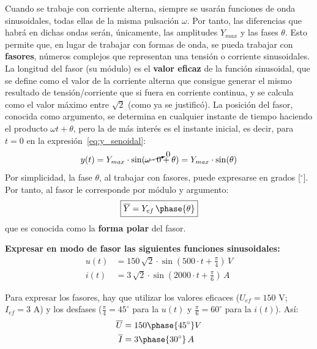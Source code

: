 Cuando se trabaje con corriente alterna, siempre se usarán funciones
de onda sinusoidales, todas ellas de la misma pulsación $\omega$. Por
tanto, las diferencias que habrá en dichas ondas serán, únicamente,
las amplitudes $Y_{max}$ y las fases $\theta$. Esto permite que, en
lugar de trabajar con formas de onda, se pueda trabajar con
\textbf{fasores}, números complejos que representan una tensión o
corriente
sinusoidales. %
La longitud del fasor (su módulo) es el \textbf{valor eficaz} de la
función sinusoidal, que se define como el valor de la corriente
alterna que consigue generar el mismo resultado de tensión/corriente
que si fuera en corriente continua, y se calcula como el valor máximo
entre $\sqrt{2}$ (como ya se justificó).
La posición del fasor, conocida como argumento, se determina en
cualquier instante de tiempo haciendo el producto $\omega t+\theta$,
pero la de más interés es el instante inicial, es decir, para $t=0$ en
la expresión~\eqref{eq:y_senoidal}:
\begin{equation*}
  y(t)=Y_{max}\cdot\sin(\cancelto{0}{\omega \cdot 0}+\theta)=Y_{max}\cdot\sin(\theta)
\end{equation*}
Por simplicidad, la fase $\theta$, al trabajar con fasores, puede
expresarse en grados [$^\circ$]. Por tanto, al fasor le corresponde
por módulo y argumento:
\begin{equation}
  \boxed{\overline{Y}=Y_{ef}\,\phase{\theta}}
\end{equation}
que es conocida como la \textbf{forma polar} del fasor.
	
\begin{example}
  \textbf{Expresar en modo de fasor las siguientes funciones
    sinusoidales:}
  \begin{align*}
    u(t)&=150\,\sqrt{2}\cdot \sin(500\cdot t+\frac{\pi}{4})\, V\\
    i(t) &= 3\,\sqrt{2}\cdot \sin(2000\cdot t+\frac{\pi}{6})\,A
  \end{align*}
		
  Para expresar los fasores, hay que utilizar los valores eficaces
  ($U_{ef}=150$ V; $I_{ef}=3$ A) y los desfases
  ($\frac{\pi}{4}=45^\circ$ para la $u(t)$ y $\frac{\pi}{6}=60^\circ$
  para la $i(t)$). Así:
  \begin{align*}
    \overline{U}&=150\phase{45^\circ} V\\
    \overline{I}&=3\phase{30^\circ}\,A
  \end{align*}
\end{example}
	
